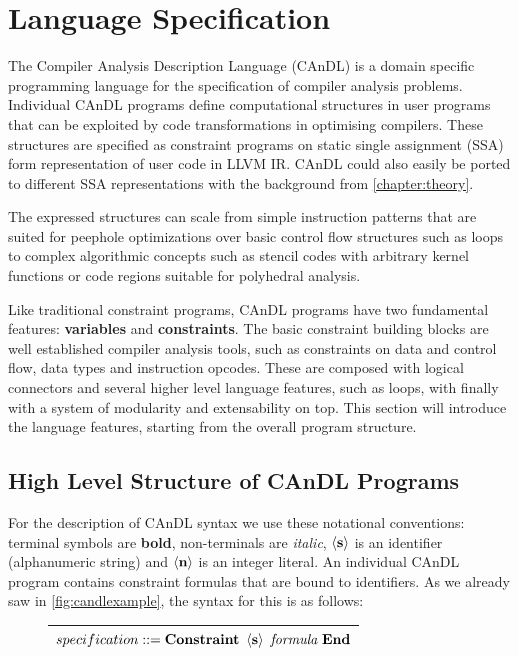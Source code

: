\begin{figure}[p]
    
    \label{fig:candlexample}
\end{figure}

\section{Language Specification}

    The Compiler Analysis Description Language (CAnDL) is a domain specific
    programming language for the specification of compiler analysis problems. 
    Individual CAnDL programs define computational structures in user programs
    that can be exploited by code transformations in optimising compilers.
    These structures are specified as constraint programs on static single
    assignment (SSA) form representation of user code in LLVM IR.
    CAnDL could also easily be ported to different SSA representations with the
    background from \autoref{chapter:theory}.

    The expressed structures can scale from simple instruction patterns that are
    suited for peephole optimizations over basic control flow structures such as
    loops to complex algorithmic concepts such as stencil codes with arbitrary
    kernel functions or code regions suitable for polyhedral analysis.

    Like traditional constraint programs, CAnDL programs have two
    fundamental features: \textbf{variables} and \textbf{constraints}.
    The basic constraint building blocks are well established compiler analysis
    tools, such as constraints on data and control flow, data types and
    instruction opcodes.
    These are composed with logical connectors and several higher level language
    features, such as loops, with finally with a system of modularity and
    extensability on top.
    This section will introduce the language features,
    starting from the overall program structure.

\subsection{High Level Structure of CAnDL Programs}

    For the description of CAnDL syntax we use these notational conventions:
    terminal symbols are {\bf bold}, non-terminals are {\it italic},
    $\left<\text{\bf s}\right>$ is an identifier (alphanumeric string) and
    $\left<\text{\bf n}\right>$ is an integer literal.
    An individual CAnDL program contains constraint formulas that are
    bound to identifiers.
    As we already saw in \autoref{fig:candlexample}, the syntax for this is as
    follows:
\begin{figure}[H]
\centering
\begin{tabular}{|c|}
    \hline
    $specification ::= \text{\bf Constraint}\ \left<\text{\bf s}\right>\ \text{\it formula}\ \text{\bf End}$\\
    \hline
\end{tabular}
\end{figure}

